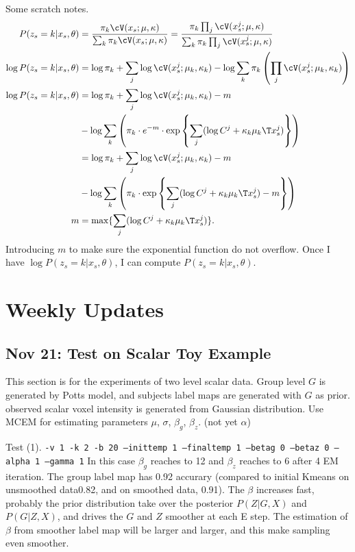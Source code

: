 \documentclass{article}
\begin{document}
Some scratch notes.
\begin{align*}
  P(z_s = k | x_s, \theta) &= \frac{\pi_k \cV(x_s; \mu, \kappa)}{\sum_k \pi_k \cV(x_s; \mu, \kappa)} = \frac{\pi_k \prod_j \cV(x_s^j; \mu, \kappa)}{\sum_k \pi_k \prod_j \cV(x_s^j; \mu, \kappa)}\\
\log P(z_s = k|x_s, \theta) &=  \log \pi_k + \sum_j \log \cV(x_s^j; \mu_k, \kappa_k) - \log \sum_k \pi_k \left( \prod_j \cV(x_s^j; \mu_k, \kappa_k) \right ) \\
\log P(z_s = k|x_s, \theta) &=  \log \pi_k + \sum_j \log \cV(x_s^j; \mu_k, \kappa_k) - m \\
& - \log \sum_k \left (\pi_k \cdot e^{-m} \cdot  \exp \left \{ \sum_j (\log C^j + \kappa_k \mu_k\T x_s^j)\right \} \right ) \\
&=  \log \pi_k + \sum_j \log \cV(x_s^j; \mu_k, \kappa_k) - m \\
& - \log \sum_k \left (\pi_k \cdot  \exp \left \{ \sum_j (\log C^j + \kappa_k \mu_k\T x_s^j) - m\right \} \right ) \\
m &= \max \{ \sum_j (\log C^j + \kappa_k \mu_k\T x_s^j) \}.
\end{align*}
Introducing $m$ to make sure the exponential function do not overflow. Once I have $\log P(z_s = k|x_s, \theta)$, I can compute $ P(z_s = k|x_s, \theta)$.

\section{Weekly Updates}
\subsection{Nov 21: Test on Scalar Toy Example}
This section is for the experiments of two level scalar data. Group level $G$ is generated by Potts model, and subjects label maps are generated with $G$ as prior. observed scalar voxel intensity is generated from Gaussian distribution. Use MCEM for estimating parameters $\mu$, $\sigma$, $\beta_g$, $\beta_z$. (not yet $\alpha$)

Test (1). \texttt{-v 1 -k 2 -b 20 --inittemp 1 --finaltemp 1 --betag 0 --betaz 0 --alpha 1 --gamma 1} In this case $\beta_g$ reaches to 12 and $\beta_z$ reaches to 6 after 4 EM iteration. The group label map has 0.92 accurary (compared to initial Kmeans on unsmoothed data0.82, and on smoothed data, 0.91). The $\beta$ increases fast, probably the prior distribution take over the posterior $P(Z|G, X)$ and $P(G|Z,X)$, and drives the $G$ and $Z$ smoother at each E step. The estimation of $\beta$ from  smoother label map will be larger and larger, and this make sampling even smoother.
\end{document}
